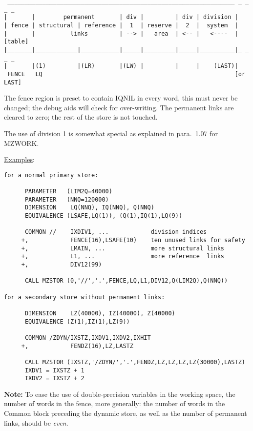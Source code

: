 \begin{verbatim}
 _________________________________________________________________ _ _ _ _
|       |        permanent       | div |         | div | division |
| fence | structural | reference |  1  | reserve |  2  |  system  |
|       |          links         | --> |   area  | <-- |   <----  | [table]
|_______|____________|___________|_____|_________|_____|__________|_ _ _ _
|       |(1)         |(LR)       |(LW) |         |     |    (LAST)|
 FENCE   LQ                                                       [or LAST]
\end{verbatim} 

The fence region is preset to contain IQNIL in every word,
this must never be changed;
the debug aids will check for over-writing.
The permanent links are cleared to zero; the rest of the store is not
touched.

The use of division 1 is somewhat special as explained
in para.~1.07 for MZWORK.

\ul{Examples}:
\begin{verbatim}
for a normal primary store:

      PARAMETER   (LIM2Q=40000)
      PARAMETER   (NNQ=120000)
      DIMENSION    LQ(NNQ), IQ(NNQ), Q(NNQ)
      EQUIVALENCE (LSAFE,LQ(1)), (Q(1),IQ(1),LQ(9))

      COMMON //    IXDIV1, ...            division indices
     +,            FENCE(16),LSAFE(10)    ten unused links for safety
     +,            LMAIN, ...             more structural links
     +,            L1, ...                more reference  links
     +,            DIV12(99)

      CALL MZSTOR (0,'//','.',FENCE,LQ,L1,DIV12,Q(LIM2Q),Q(NNQ))

for a secondary store without permanent links:

      DIMENSION    LZ(40000), IZ(40000), Z(40000)
      EQUIVALENCE (Z(1),IZ(1),LZ(9))

      COMMON /ZDYN/IXSTZ,IXDV1,IXDV2,IXHIT
     +,            FENDZ(16),LZ,LASTZ

      CALL MZSTOR (IXSTZ,'/ZDYN/','.',FENDZ,LZ,LZ,LZ,LZ(30000),LASTZ)
      IXDV1 = IXSTZ + 1
      IXDV2 = IXSTZ + 2
\end{verbatim} 
{\bf Note:}  To ease the use of double-precision variables
in the working space,
the number of words in the fence,
more generally: the number of words in the Common block
preceding the dynamic store,
as well as the number of permanent links,
should be {\em even}.


